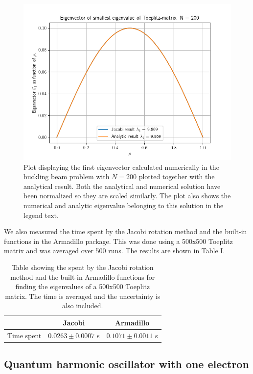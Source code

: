 \documentclass[reprint,english,notitlepage]{revtex4-1}  %
\begin{document}
\begin{figure}[h!] \label{fig:IV:a:1}
\includegraphics[scale=0.6]{toeplitz.png}
\caption{Plot displaying the first eigenvector calculated numerically in the buckling beam problem with $N=200$ plotted together with the analytical result. Both the analytical and numerical solution have been normalized so they are scaled similarly. The plot also shows the numerical and analytic eigenvalue belonging to this solution in the legend text.}
\end{figure}

We also measured the time spent by the Jacobi rotation method and the built-in functions in the Armadillo package. This was done using a 500x500 Toeplitz matrix and was averaged over 500 runs. The results are shown in \hyperref[table:IV:a:1]{Table I}.

\begin{table}[h!] \label{table:IV:a:1}
\caption{Table showing the spent by the Jacobi rotation method and the built-in Armadillo functions for finding the eigenvalues of a 500x500 Toeplitz matrix. The time is averaged and the uncertainty is also included.}
\begin{tabular}{|c|c|c|}
\hline
 & Jacobi & Armadillo \\
\hline
Time spent & $0.0263 \pm 0.0007$ s & $0.1071 \pm 0.0011$ s \\
\hline
\end{tabular}
\end{table}




\subsection{Quantum harmonic oscillator with one electron} \label{sec:IV:b}
\end{document}
